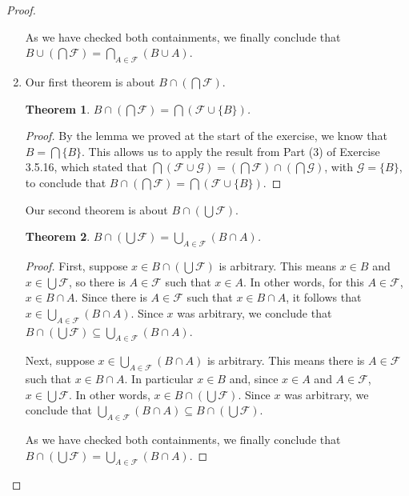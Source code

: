 \documentclass[12pt]{amsart}
\newtheorem{theorem}{Theorem}
\theoremstyle{definition}
\theoremstyle{remark}
\begin{document}
\begin{proof}
\begin{enumerate}
	As we have checked both containments, we finally conclude that
	$B \cup \left( \bigcap \mathcal{F} \right) = \bigcap_{A \in \mathcal{F}} (B \cup A)$.
	
	\item Our first theorem is about $B \cap \left( \bigcap \mathcal{F} \right)$.
	\begin{theorem}
		$B \cap \left( \bigcap \mathcal{F} \right) = \bigcap (\mathcal{F} \cup \{ B \})$.
	\end{theorem}
	\begin{proof}
		By the lemma we proved at the start of the exercise, we know that
		$B = \bigcap \{ B \}$.
		This allows us to apply the result from Part (3) of Exercise 3.5.16, which stated that
		$\bigcap (\mathcal{F} \cup \mathcal{G}) =
		\left( \bigcap \mathcal{F} \right) \cap \left( \bigcap \mathcal{G} \right)$,
		with $\mathcal{G} = \{ B \}$, to conclude that $B \cap \left( \bigcap \mathcal{F} \right) = 
		\bigcap (\mathcal{F} \cup \{ B \})$.
	\end{proof}
	Our second theorem is about $B \cap \left( \bigcup \mathcal{F} \right)$.
	\begin{theorem}
		$B \cap \left( \bigcup \mathcal{F} \right) = \bigcup_{A \in \mathcal{F}} (B \cap A)$.
	\end{theorem}
	\begin{proof}
		First, suppose $x \in B \cap \left( \bigcup \mathcal{F} \right)$ is arbitrary.
		This means $x \in B$ and $x \in \bigcup \mathcal{F}$,
		so there is $A \in \mathcal{F}$ such that $x \in A$.
		In other words, for this $A \in \mathcal{F}$, $x \in B \cap A$.
		Since there is $A \in \mathcal{F}$ such that $x \in B \cap A$, it follows that
		$x \in \bigcup_{A \in \mathcal{F}} (B \cap A)$.
		Since $x$ was arbitrary, we conclude that
		$B \cap \left( \bigcup \mathcal{F} \right) \subseteq \bigcup_{A \in \mathcal{F}} (B \cap A)$.
		
		Next, suppose $x \in \bigcup_{A \in \mathcal{F}} (B \cap A)$ is arbitrary.
		This means there is $A \in \mathcal{F}$ such that $x \in B \cap A$.
		In particular $x \in B$ and, since $x \in A$ and $A \in \mathcal{F}$, 
		$x \in \bigcup \mathcal{F}$.
		In other words, $x \in B \cap \left( \bigcup \mathcal{F} \right)$.
		Since $x$ was arbitrary, we conclude that
		$\bigcup_{A \in \mathcal{F}} (B \cap A) \subseteq B \cap \left( \bigcup \mathcal{F} \right)$.
		
		As we have checked both containments, we finally conclude that
		$B \cap \left( \bigcup \mathcal{F} \right) = \bigcup_{A \in \mathcal{F}} (B \cap A)$.
	\end{proof}
\end{enumerate}
\end{proof}
\end{document}
